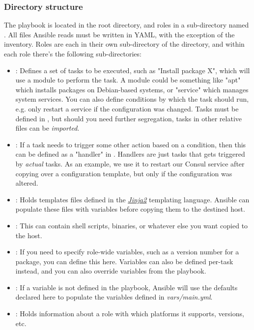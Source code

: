             \subsubsection{Directory structure}
                The playbook is located in the root directory, and roles in a sub-directory named . All files Ansible reads must be written in YAML, with the exception of the inventory. Roles are each in their own sub-directory of the  directory, and within each role there's the following sub-directories:
                \begin{itemize}
                    \item {}: Defines a set of tasks to be executed, such as "Install package X", which will use a module to perform the task. A module could be something like "apt" which installs packages on Debian-based systems, or "service" which manages system services. You can also define conditions by which the task should run, e.g. only restart a service if the configuration was changed. Tasks must be defined in , but should you need further segregation, tasks in other relative files can be \textit{imported}.
                    \item {}: If a task needs to trigger some other action based on a condition, then this can be defined as a "handler" in . Handlers are just tasks that gets triggered by \textit{actual} tasks. As an example, we use it to restart our Consul service after copying over a configuration template, but only if the configuration was altered. 
                    \item {}: Holds templates files defined in the \href{http://jinja.pocoo.org/docs/2.10/}{\textit{Jinja2}} templating language. Ansible can populate these files with variables before copying them to the destined host.
                    \item {}: This can contain shell scripts, binaries, or whatever else you want copied to the host. 
                    \item {}: If you need to specify role-wide variables, such as a version number for a package, you can define this here. Variables can also be defined per-task instead, and you can also override variables from the playbook.
                    \item {}: If a variable is not defined in the playbook, Ansible will use the defaults declared here to populate the variables defined in \textit{vars/main.yml}.
                    \item {}: Holds information about a role with which platforms it supports, versions, etc.
                \end{itemize}

